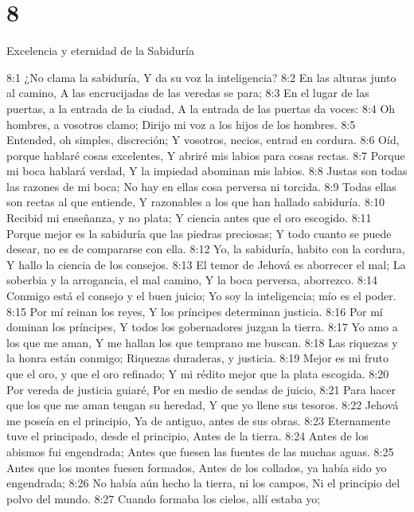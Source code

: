 \chapter{8}

Excelencia y eternidad de la Sabiduría  

8:1 ¿No clama la sabiduría,  
Y da su voz la inteligencia?  
8:2 En las alturas junto al camino,  
A las encrucijadas de las veredas se para;  
8:3 En el lugar de las puertas, a la entrada de la ciudad,  
A la entrada de las puertas da voces: 
8:4 Oh hombres, a vosotros clamo;  
Dirijo mi voz a los hijos de los hombres.  
8:5 Entended, oh simples, discreción;  
Y vosotros, necios, entrad en cordura.  
8:6 Oíd, porque hablaré cosas excelentes,  
Y abriré mis labios para cosas rectas. 
8:7 Porque mi boca hablará verdad,  
Y la impiedad abominan mis labios.  
8:8 Justas son todas las razones de mi boca;  
No hay en ellas cosa perversa ni torcida.  
8:9 Todas ellas son rectas al que entiende,  
Y razonables a los que han hallado sabiduría.  
8:10 Recibid mi enseñanza, y no plata;  
Y ciencia antes que el oro escogido.  
8:11 Porque mejor es la sabiduría que las piedras preciosas;  
Y todo cuanto se puede desear, no es de compararse con ella.  
8:12 Yo, la sabiduría, habito con la cordura,  
Y hallo la ciencia de los consejos.  
8:13 El temor de Jehová es aborrecer el mal;  
La soberbia y la arrogancia, el mal camino,  
Y la boca perversa, aborrezco.  
8:14 Conmigo está el consejo y el buen juicio;  
Yo soy la inteligencia; mío es el poder.  
8:15 Por mí reinan los reyes,  
Y los príncipes determinan justicia.  
8:16 Por mí dominan los príncipes,  
Y todos los gobernadores juzgan la tierra.  
8:17 Yo amo a los que me aman,  
Y me hallan los que temprano me buscan.  
8:18 Las riquezas y la honra están conmigo;  
Riquezas duraderas, y justicia.  
8:19 Mejor es mi fruto que el oro, y que el oro refinado;  
Y mi rédito mejor que la plata escogida.  
8:20 Por vereda de justicia guiaré,  
Por en medio de sendas de juicio,  
8:21 Para hacer que los que me aman tengan su heredad,  
Y que yo llene sus tesoros.  
8:22 Jehová me poseía en el principio,  
Ya de antiguo, antes de sus obras. 
8:23 Eternamente tuve el principado, desde el principio,  
Antes de la tierra.  
8:24 Antes de los abismos fui engendrada;  
Antes que fuesen las fuentes de las muchas aguas.  
8:25 Antes que los montes fuesen formados,  
Antes de los collados, ya había sido yo engendrada;  
8:26 No había aún hecho la tierra, ni los campos,  
Ni el principio del polvo del mundo.  
8:27 Cuando formaba los cielos, allí estaba yo;  
